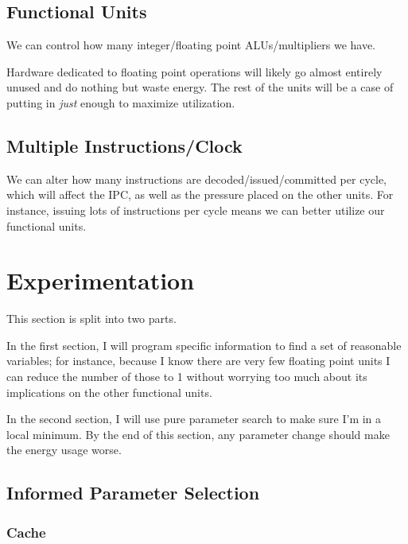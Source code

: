 \documentclass{article}
\begin{document}
\begin{multicols}{2}
  \subsection{Functional Units}
  We can control how many integer/floating point ALUs/multipliers we have.

  Hardware dedicated to floating point operations will likely go almost entirely unused and do nothing but waste energy. The rest of the units will be a case of putting in \textit{just} enough to maximize utilization.

  \subsection{Multiple Instructions/Clock}
  We can alter how many instructions are decoded/issued/committed per cycle, which will affect the IPC, as well as the pressure placed on the other units. For instance, issuing lots of instructions per cycle means we can better utilize our functional units.

  \section{Experimentation}
  This section is split into two parts.

  In the first section, I will program specific information to find a set of reasonable variables; for instance, because I know there are very few floating point units I can reduce the number of those to 1 without worrying too much about its implications on the other functional units.

  In the second section, I will use pure parameter search to make sure I'm in a local minimum. By the end of this section, any parameter change should make the energy usage worse.

  \subsection{Informed Parameter Selection}

  \subsubsection{Cache}

\end{multicols}
\end{document}
